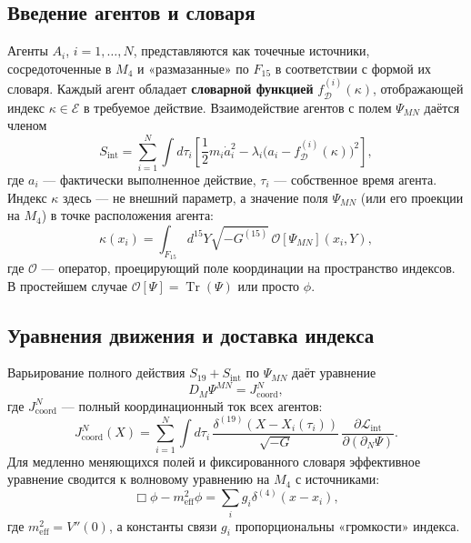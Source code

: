 \documentclass[11pt,a4paper]{article}
\DeclareMathOperator*{\Tr}{Tr}
\begin{document}
	\subsection{Введение агентов и словаря}
	
	Агенты \(A_i\), \(i=1,\dots,N\), представляются как точечные источники, сосредоточенные в \(M_4\) и «размазанные» по \(F_{15}\) в соответствии с формой их словаря. Каждый агент обладает \textbf{словарной функцией} \(f_{\mathcal{D}}^{(i)}(\kappa)\), отображающей индекс \(\kappa \in \mathcal{E}\) в требуемое действие. Взаимодействие агентов с полем \(\Psi_{MN}\) даётся членом
	\begin{equation}
		S_{\mathrm{int}} = \sum_{i=1}^{N} \int d\tau_i \left[ \frac{1}{2} m_i \dot a_i^2 - \lambda_i \bigl( a_i - f_{\mathcal{D}}^{(i)}(\kappa) \bigr)^2 \right],
		\label{eq:Sint}
	\end{equation}
	где \(a_i\) — фактически выполненное действие, \(\tau_i\) — собственное время агента. Индекс \(\kappa\) здесь — не внешний параметр, а значение поля \(\Psi_{MN}\) (или его проекции на \(M_4\)) в точке расположения агента:
	\begin{equation}
		\kappa(x_i) = \int_{F_{15}} d^{15}Y \sqrt{-G^{(15)}}\, \mathcal{O}[\Psi_{MN}](x_i, Y),
		\label{eq:kappa}
	\end{equation}
	где \(\mathcal{O}\) — оператор, проецирующий поле координации на пространство индексов. В простейшем случае \(\mathcal{O}[\Psi] = \Tr(\Psi)\) или просто \(\phi\).
	
	\subsection{Уравнения движения и доставка индекса}
	
	Варьирование полного действия \(S_{19} + S_{\mathrm{int}}\) по \(\Psi_{MN}\) даёт уравнение
	\begin{equation}
		D_M \Psi^{MN} = J^{N}_{\mathrm{coord}},
		\label{eq:Psi-eq}
	\end{equation}
	где \(J^{N}_{\mathrm{coord}}\) — полный координационный ток всех агентов:
	\begin{equation}
		J^{N}_{\mathrm{coord}}(X) = \sum_{i=1}^{N} \int d\tau_i\, \frac{\delta^{(19)}(X - X_i(\tau_i))}{\sqrt{-G}}\, \frac{\partial \mathcal{L}_{\mathrm{int}}}{\partial (\partial_N \Psi)}.
	\end{equation}
	Для медленно меняющихся полей и фиксированного словаря эффективное уравнение сводится к волновому уравнению на \(M_4\) с источниками:
	\begin{equation}
		\Box \phi - m_{\mathrm{eff}}^2 \phi = \sum_{i} g_i \delta^{(4)}(x - x_i),
		\label{eq:phi-eq}
	\end{equation}
	где \(m_{\mathrm{eff}}^2 = V''(0)\), а константы связи \(g_i\) пропорциональны «громкости» индекса.
	
\end{document}
